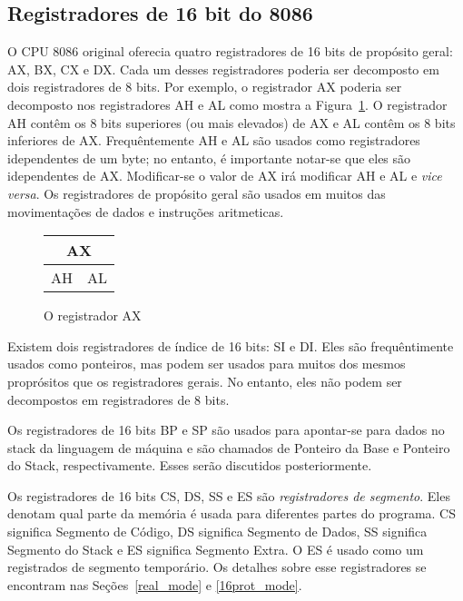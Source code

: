 \subsection{Registradores de 16 bit do 8086}

O CPU 8086 original oferecia quatro registradores de 16 bits de propósito 
geral: AX, BX, CX e DX. Cada um desses registradores poderia ser decomposto em 
dois registradores de 8 bits. Por exemplo, o registrador AX poderia ser 
decomposto nos registradores AH e AL como mostra a Figura~\ref{fig:AX_reg}. O 
registrador AH contêm os 8 bits superiores (ou mais elevados) de AX  e AL 
contêm os 8 bits inferiores de AX. Frequêntemente AH e AL são usados como 
registradores idependentes de um byte; no entanto, é importante notar-se que 
eles são idependentes de AX. Modificar-se o valor de AX irá modificar AH e AL 
e {\em vice versa}\/. Os registradores de propósito geral são usados em muitos 
das movimentações de dados e instruções aritmeticas.


\begin{figure}
\begin{center}
\begin{tabular}{cc}
\multicolumn{2}{c}{AX} \\
\hline
\multicolumn{1}{||c|}{AH} & \multicolumn{1}{c||}{AL} \\
\hline
\end{tabular}
\caption{O registrador AX \label{fig:AX_reg} }
\end{center}
\end{figure}

Existem dois registradores de índice de 16 bits: SI e DI. 
Eles são frequêntimente usados como ponteiros, mas podem ser usados para 
muitos dos mesmos proprósitos que os registradores gerais. No entanto, eles 
não podem ser decompostos em registradores de 8 bits.

Os registradores de 16 bits BP e SP são usados para apontar-se para dados no 
stack da linguagem de máquina e são chamados de Ponteiro da 
Base e Ponteiro do 
Stack, respectivamente. Esses serão discutidos 
posteriormente.

Os registradores de 16 bits CS, DS, SS e ES são \emph{registradores de 
segmento}.  Eles denotam qual parte da memória é usada 
para diferentes partes do programa. CS significa Segmento de Código, DS 
significa Segmento de Dados, SS significa Segmento do Stack e ES significa 
Segmento Extra. O ES é usado como um registrados de segmento temporário. Os 
detalhes sobre esse registradores se encontram nas Seções~\ref{real_mode} e 
\ref{16prot_mode}.

